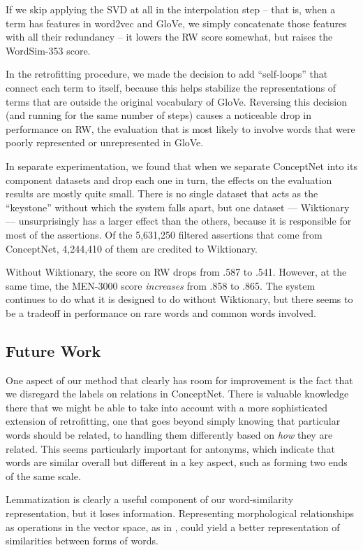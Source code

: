 \documentclass[11pt,letterpaper]{article}
\begin{document}
If we skip applying the SVD at all in the interpolation step -- that is, when a
term has features in word2vec and GloVe, we simply concatenate those features
with all their redundancy -- it lowers the RW score somewhat, but raises the
WordSim-353 score.

In the retrofitting procedure, we made the decision to add ``self-loops'' that
connect each term to itself, because this helps stabilize the
representations of terms that are outside the original vocabulary of GloVe.
Reversing this decision (and running for the same number of steps) causes a
noticeable drop in performance on RW, the evaluation that is most likely to
involve words that were poorly represented or unrepresented in GloVe.

In separate experimentation, we found that when we separate ConceptNet into its
component datasets and drop each one in turn, the effects on the evaluation
results are mostly quite small. There is no single dataset that acts as the
``keystone'' without which the system falls apart, but one dataset ---
Wiktionary --- unsurprisingly has a larger effect than the others, because it
is responsible for most of the assertions. Of the 5,631,250 filtered assertions
that come from ConceptNet, 4,244,410 of them are credited to Wiktionary.

Without Wiktionary, the score on RW drops from .587 to .541. However, at the
same time, the MEN-3000 score {\em increases} from .858 to .865. The system
continues to do what it is designed to do without Wiktionary, but there seems to
be a tradeoff in performance on rare words and common words involved.

\subsection{Future Work}

One aspect of our method that clearly has room for improvement is the fact that
we disregard the labels on relations in ConceptNet.  There is valuable
knowledge there that we might be able to take into account with a more
sophisticated extension of retrofitting, one that goes beyond simply knowing
that particular words should be related, to handling them differently based on
{\em how} they are related. This seems particularly important for antonyms,
which indicate that words are similar overall but different in a key aspect,
such as forming two ends of the same scale.

Lemmatization is clearly a useful component of our word-similarity
representation, but it loses information. Representing morphological
relationships as operations in the vector space, as in
, could yield a better representation of
similarities between forms of words.
\end{document}

